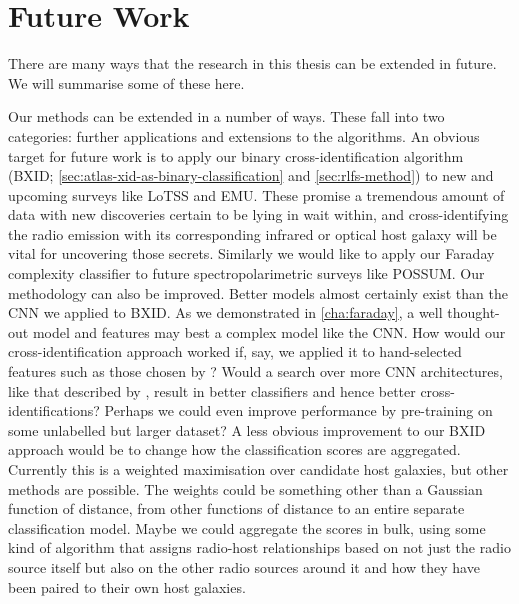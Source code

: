 


\section{Future Work}
\label{sec:future}

    There are many ways that the research in this thesis can be extended in future. We will summarise some of these here.

    Our methods can be extended in a number of ways. These fall into two categories: further applications and extensions to the algorithms. An obvious target for future work is to apply our binary cross-identification algorithm (BXID; \autoref{sec:atlas-xid-as-binary-classification} and \autoref{sec:rlfs-method}) to new and upcoming surveys like LoTSS and EMU. These promise a tremendous amount of data with new discoveries certain to be lying in wait within, and cross-identifying the radio emission with its corresponding infrared or optical host galaxy will be vital for uncovering those secrets. Similarly we would like to apply our Faraday complexity classifier to future spectropolarimetric surveys like POSSUM. Our methodology can also be improved. Better models almost certainly exist than the CNN we applied to BXID. As we demonstrated in \autoref{cha:faraday}, a well thought-out model and features may best a complex model like the CNN. How would our cross-identification approach worked if, say, we applied it to hand-selected features such as those chosen by \citet{proctor06}? Would a search over more CNN architectures, like that described by \citet{lukic_morphological_2019}, result in better classifiers and hence better cross-identifications? Perhaps we could even improve performance by pre-training on some unlabelled but larger dataset? A less obvious improvement to our BXID approach would be to change how the classification scores are aggregated. Currently this is a weighted maximisation over candidate host galaxies, but other methods are possible. The weights could be something other than a Gaussian function of distance, from other functions of distance to an entire separate classification model. Maybe we could aggregate the scores in bulk, using some kind of algorithm that assigns radio-host relationships based on not just the radio source itself but also on the other radio sources around it and how they have been paired to their own host galaxies.

